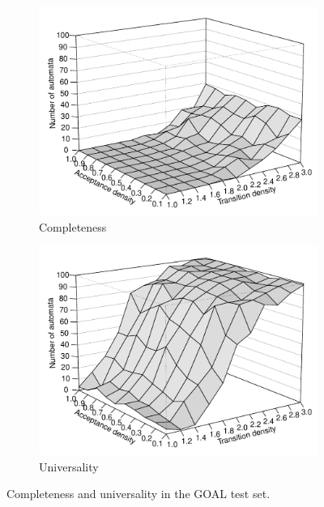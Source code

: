 \begin{figure}
  \begin{subfigure}[t]{0.475\textwidth}
  \centering
  \hfil
  \includegraphics[width=\textwidth]{figures/r/completeness/persp.pdf}
  \caption{Completeness}
  \end{subfigure}
  \hfill
  \begin{subfigure}[t]{0.475\textwidth}
  \centering
  \includegraphics[width=\textwidth]{figures/r/universality/persp.pdf}
  \caption{Universality}
  \end{subfigure}
  \hfil
\caption{Completeness and universality in the GOAL test set.}
\end{figure}


